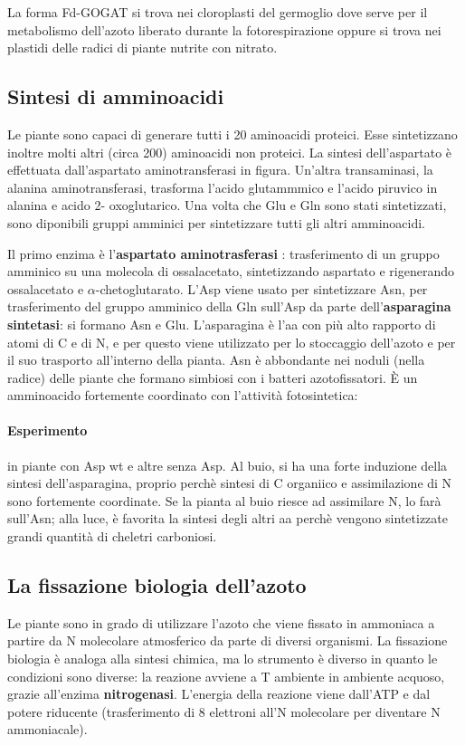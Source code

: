\documentclass[a4paper,12pt]{book}
\begin{document}
La forma Fd-GOGAT si trova nei cloroplasti del germoglio dove serve per il metabolismo dell’azoto liberato durante
la fotorespirazione oppure si trova nei plastidi delle radici di piante nutrite con nitrato.
\subsection{Sintesi di amminoacidi}
Le piante sono capaci di generare tutti i 20 aminoacidi proteici. Esse sintetizzano inoltre molti altri (circa 200)
aminoacidi non proteici. La sintesi dell’aspartato è effettuata dall’aspartato aminotransferasi in figura. Un’altra
transaminasi, la alanina aminotransferasi, trasforma l’acido glutammmico e l’acido piruvico in alanina e acido 2-
oxoglutarico.
Una volta che Glu e Gln sono stati sintetizzati, sono diponibili gruppi amminici per sintetizzare tutti gli altri amminoacidi.

Il primo enzima è l'\textbf{aspartato aminotrasferasi} : trasferimento di un gruppo amminico su una molecola di ossalacetato, sintetizzando aspartato e rigenerando ossalacetato e $\alpha$-chetoglutarato. L'Asp viene usato per sintetizzare Asn, per trasferimento del gruppo amminico della Gln sull'Asp da parte dell'\textbf{asparagina sintetasi}: si formano Asn e Glu. L'asparagina è l'aa con più alto rapporto di atomi di C e di N, e per questo viene utilizzato per lo stoccaggio dell'azoto e per il suo trasporto all'interno della pianta. Asn è abbondante nei noduli (nella radice) delle piante che formano simbiosi con i batteri azotofissatori. È un amminoacido fortemente coordinato con l'attività fotosintetica:

\paragraph{Esperimento} in piante con Asp wt e altre senza Asp. Al buio, si ha una forte induzione della sintesi dell'asparagina, proprio perchè sintesi di C organiico e assimilazione di N sono fortemente coordinate. Se la pianta al buio riesce ad assimilare N, lo farà sull'Asn; alla luce, è favorita la sintesi degli altri aa perchè vengono sintetizzate grandi quantità di cheletri carboniosi.

\subsection{La fissazione biologia dell'azoto}
Le piante sono in grado di utilizzare l'azoto che viene fissato in ammoniaca a partire da N molecolare atmosferico da parte di diversi organismi. 
La fissazione biologia è analoga alla sintesi chimica, ma lo strumento è diverso in quanto le condizioni sono diverse: la reazione avviene a T ambiente in ambiente acquoso, grazie all'enzima \textbf{nitrogenasi}. L'energia della reazione viene dall'ATP e dal potere riducente (trasferimento di 8 elettroni all'N molecolare per diventare N ammoniacale).
\end{document}
